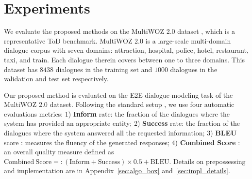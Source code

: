 \vspace{-.4em}
\section{Experiments}\label{sec:exp}
\vspace{-.4em}

We evaluate the proposed methods on the MultiWOZ 2.0 dataset \citep{multiwoz2018}, which is a representative ToD benchmark.
MultiWOZ 2.0 is a large-scale multi-domain dialogue corpus 
with seven domains:  attraction, hospital, police, hotel, restaurant, taxi, and train. Each dialogue therein covers between one to three domains.
This dataset has $8438$ dialogues in the training set and $1000$ dialogues in the validation and test set respectively.

Our proposed method is evaluated on the E2E dialogue-modeling task of the MultiWOZ 2.0 dataset.
Following the standard setup \citep[\eg,][]{multiwoz2018,sfnrl2019}, we use four automatic evaluations metrics:
1) \textbf{Inform} rate: the fraction of the dialogues where the system has provided an appropriate entity;
2) \textbf{Success} rate: the fraction of the dialogues where the system answered all the requested information;
3) \textbf{BLEU} score \citep{bleu2002}: measures the fluency of the generated responses;
4) \textbf{Combined Score} \citep{sfnrl2019}: an overall quality measure defined as $\mathrm{Combined~Score} =: (\mathrm{Inform} + \mathrm{Success}) \times 0.5 + \mathrm{BLEU}$.
Details on prepossessing and implementation are in Appendix~\ref{sec:algo_box} and~\ref{sec:impl_details}.


